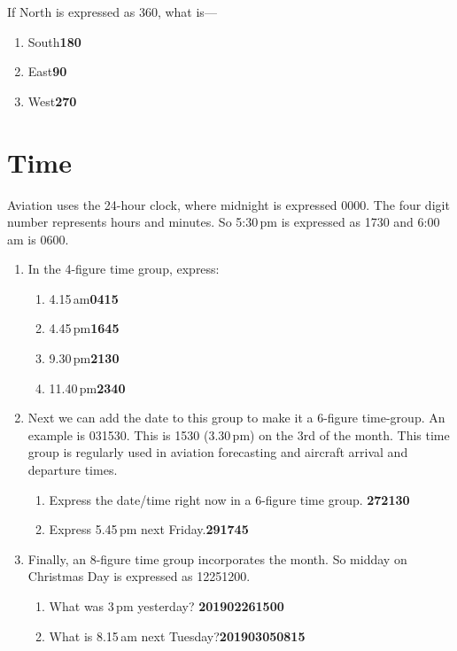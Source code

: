 \documentclass[11pt]{article}
\begin{document}
\begin{enumerate}
	If North is expressed as 360, what is---
	\begin{enumerate}
		\item South\hfill\textbf{180}
		\item East\hfill\textbf{90}
		\item West\hfill\textbf{270}
	\end{enumerate}
\end{enumerate}

\section{Time}
Aviation uses the 24-hour clock, where midnight is expressed 0000. The four digit number represents hours and minutes. 
So 5:30\,pm is expressed as 1730 and 6:00\,am is 0600.

\begin{enumerate}
	\item In the 4-figure time group, express:
	\begin{enumerate}
		\item 4.15\,am\hfill\textbf{0415}
		\item 4.45\,pm\hfill\textbf{1645}
		\item 9.30\,pm\hfill\textbf{2130}
		\item 11.40\,pm\hfill\textbf{2340}
	\end{enumerate}
	\item Next we can add the date to this group to make it a 6-figure time-group. 
	An example is 031530. This is 1530 (3.30\,pm) on the 3rd of the month. This time 
	group is regularly used in aviation forecasting and aircraft arrival and departure
	times.
	\begin{enumerate}
		\item Express the date/time right now in a 6-figure time group. \hfill\textbf{272130}
		\item Express 5.45\,pm next Friday.\hfill\textbf{291745}
	\end{enumerate}
	\item Finally, an 8-figure time group incorporates the month. So midday on Christmas Day is 
	expressed as 12251200.
	\begin{enumerate}
		\item What was 3\,pm yesterday?     \hfill\textbf{201902261500}
		\item What is 8.15\,am next Tuesday?\hfill\textbf{201903050815}
	\end{enumerate}
\end{enumerate}
\end{document}
